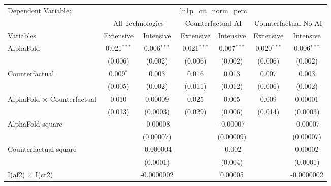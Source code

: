 \begingroup
\centering
\begin{tabular}{lcccccc}
   \tabularnewline \midrule \midrule
   Dependent Variable: & \multicolumn{6}{c}{ln1p\_cit\_norm\_perc}\\
 & \multicolumn{2}{c}{All Technologies} & \multicolumn{2}{c}{Counterfactual AI} & \multicolumn{2}{c}{Counterfactual No AI} \\
\cmidrule(lr){1-1}\cmidrule(lr){2-3} \cmidrule(lr){4-5} \cmidrule(lr){6-7}
Variables & \multicolumn{1}{c}{Extensive} & \multicolumn{1}{c}{Intensive} & \multicolumn{1}{c}{Extensive} & \multicolumn{1}{c}{Intensive} & \multicolumn{1}{c}{Extensive} & \multicolumn{1}{c}{Intensive} \\
\cmidrule(lr){1-1}\cmidrule(lr){2-2} \cmidrule(lr){3-3} \cmidrule(lr){4-4} \cmidrule(lr){5-5} \cmidrule(lr){6-6} \cmidrule(lr){7-7}
   AlphaFold                          & 0.021$^{***}$ & 0.006$^{***}$ & 0.021$^{***}$ & 0.007$^{***}$ & 0.020$^{***}$ & 0.006$^{***}$\\   
                                      & (0.006)       & (0.002)       & (0.006)       & (0.002)       & (0.006)       & (0.002)\\   
   Counterfactual                     & 0.009$^{*}$   & 0.003         & 0.016         & 0.013         & 0.007         & 0.003\\   
                                      & (0.005)       & (0.002)       & (0.011)       & (0.012)       & (0.006)       & (0.002)\\   
   AlphaFold $\times$ Counterfactual  & 0.010         & 0.00009       & 0.025         & 0.005         & 0.009         & 0.00001\\   
                                      & (0.013)       & (0.0003)      & (0.029)       & (0.006)       & (0.014)       & (0.0003)\\   
   AlphaFold square                   &               & -0.00008      &               & -0.00007      &               & -0.00007\\   
                                      &               & (0.00007)     &               & (0.00009)     &               & (0.00007)\\   
   Counterfactual square              &               & -0.000004     &               & -0.002        &               & 0.00002\\   
                                      &               & (0.0001)      &               & (0.004)       &               & (0.0001)\\   
   I(af\^2) $\times$ I(ct\^2)         &               & -0.0000002    &               & 0.00005       &               & -0.0000002\\   

\end{tabular}

